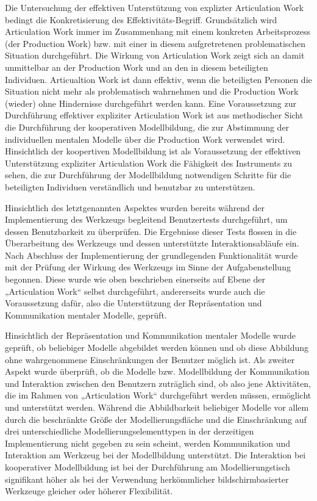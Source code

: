Die Untersuchung der effektiven Unterstützung von explizter Articulation Work bedingt die Konkretisierung des Effektivitäts-Begriff. Grundsätzlich wird Articulation Work immer im Zusammenhang mit einem konkreten Arbeitsprozess (der Production Work) bzw. mit einer in diesem aufgretretenen problematischen Situation durchgeführt. Die Wirkung von Articulation Work zeigt sich an damit unmittelbar an der Production Work und an den in diesem beteiligten Individuen. Articualtion Work ist dann effektiv, wenn die beteiligten Personen die Situation nicht mehr als problematisch wahrnehmen  und die Production Work (wieder) ohne Hindernisse durchgeführt werden kann. Eine Voraussetzung zur Durchführung effektiver expliziter Articulation Work ist aus methodischer Sicht die Durchführung der kooperativen Modellbildung, die zur Abstimmung der individuellen mentalen Modelle über die Production Work verwendet wird. Hinsichtlich der koopertiven Modellbildung ist als Voraussetzung der effektiven Unterstützung expliziter Articulation Work die Fähigkeit des Instruments zu sehen, die zur Durchführung der Modellbildung notwendigen Schritte für die beteiligten Individuen verständlich und benutzbar zu unterstützen.

Hinsichtlich des letztgenannten Aspektes wurden bereits während der Implementierung des Werkzeugs begleitend Benutzertests durchgeführt, um dessen Benutzbarkeit zu überprüfen. Die Ergebnisse dieser Tests flossen in die Überarbeitung des Werkzeugs und dessen unterstützte Interaktionsabläufe ein. Nach Abschluss der Implementierung der grundlegenden Funktionalität wurde mit der Prüfung der Wirkung des Werkzeugs im Sinne der Aufgabenstellung begonnen. Diese wurde wie oben beschrieben einerseits auf Ebene der „Articulation Work“ selbst durchgeführt, andererseits wurde auch die Voraussetzung dafür, also die Unterstützung der Repräsentation und Kommunikation mentaler Modelle, geprüft.

Hinsichtlich der Repräsentation und Kommunikation mentaler Modelle wurde geprüft, ob beliebiger Modelle abgebildet werden können und ob diese Abbildung ohne wahrgenommene Einschränkungen der Benutzer möglich ist. Als zweiter Aspekt wurde überprüft, ob die Modelle bzw. Modellbildung der Kommunikation und Interaktion zwischen den Benutzern zuträglich sind, ob also jene Aktivitäten, die im Rahmen von „Articulation Work“ durchgeführt werden müssen, ermöglicht und unterstützt werden. Während die Abbildbarkeit beliebiger Modelle vor allem durch die beschränkte Größe der Modellierungsfläche und die Einschränkung auf drei unterschiedliche Modellierungselementtypen in der derzeitigen Implementierung nicht gegeben zu sein scheint, werden Kommunikation und Interaktion am Werkzeug bei der Modellbildung unterstützt. Die Interaktion bei kooperativer Modellbildung ist bei der Durchführung am Modellierungstisch signifikant höher als bei der Verwendung herkömmlicher bildschirmbasierter Werkzeuge gleicher oder höherer Flexibilität.

